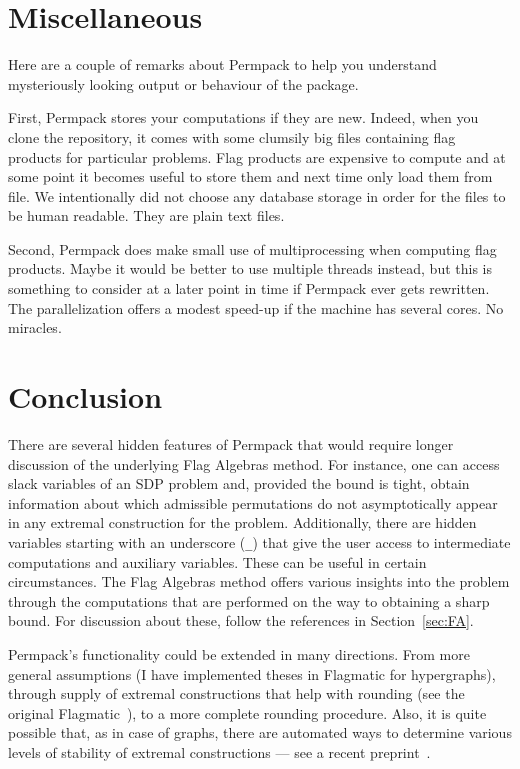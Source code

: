 \section{Miscellaneous}
\label{sec:permpack-misc}
Here are a couple of remarks about Permpack to help you understand mysteriously looking output or behaviour of the package.

First, Permpack stores your computations if they are new. Indeed, when you clone the repository, it comes with some clumsily big files containing flag products for particular problems. Flag products are expensive to compute and at some point it becomes useful to store them and next time only load them from file. We intentionally did not choose any database storage in order for the files to be human readable. They are plain text files. 

Second, Permpack does make small use of multiprocessing when computing flag products. Maybe it would be better to use multiple threads instead, but this is something to consider at a later point in time if Permpack ever gets rewritten. The parallelization offers a modest speed-up if the machine has several cores. No miracles.

\section{Conclusion}

There are several hidden features of Permpack that would require longer discussion of the underlying Flag Algebras method. For instance, one can access slack variables of an SDP problem and, provided the bound is tight, obtain information about which admissible permutations do not asymptotically appear in any extremal construction for the problem. Additionally, there are hidden variables starting with an underscore (\texttt{\_}) that give the user access to intermediate computations and auxiliary variables. These can be useful in certain circumstances. The Flag Algebras method offers various insights into the problem through the computations that are performed on the way to obtaining a sharp bound. For discussion about these, follow the references in Section~\ref{sec:FA}. 

Permpack's functionality could be extended in many directions. From more general assumptions (I have implemented theses in Flagmatic for hypergraphs), through supply of extremal constructions that help with rounding (see the original Flagmatic~\cite{flagmatic}), to a more complete rounding procedure. Also, it is quite possible that, as in case of graphs, there are automated ways to determine various levels of stability of extremal constructions --- see a recent preprint~\cite{olegmekostas}. 

